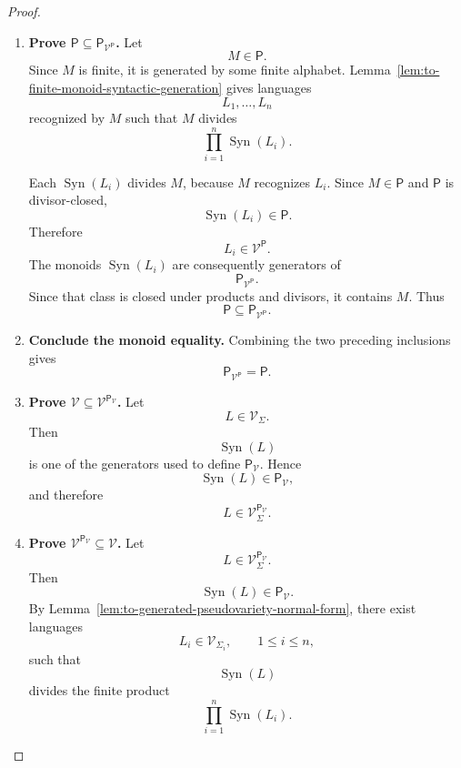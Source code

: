\begin{proof}
\begin{enumerate}
        \item \textbf{Prove
        \(\mathsf P\subseteq\mathsf P_{\mathcal V^{\mathsf P}}\).}
        Let
        \[
            M\in\mathsf P.
        \]
        Since \(M\) is finite, it is generated by some finite alphabet.
        Lemma~\ref{lem:to-finite-monoid-syntactic-generation} gives languages
        \[
            L_1,\dots,L_n
        \]
        recognized by \(M\) such that \(M\) divides
        \[
            \prod_{i=1}^n\operatorname{Syn}(L_i).
        \]

        Each \(\operatorname{Syn}(L_i)\) divides \(M\), because \(M\)
        recognizes \(L_i\). Since \(M\in\mathsf P\) and \(\mathsf P\) is
        divisor-closed,
        \[
            \operatorname{Syn}(L_i)\in\mathsf P.
        \]
        Therefore
        \[
            L_i\in\mathcal V^{\mathsf P}.
        \]
        The monoids \(\operatorname{Syn}(L_i)\) are consequently generators
        of
        \[
            \mathsf P_{\mathcal V^{\mathsf P}}.
        \]
        Since that class is closed under products and divisors, it contains
        \(M\). Thus
        \[
            \mathsf P
            \subseteq
            \mathsf P_{\mathcal V^{\mathsf P}}.
        \]

        \item \textbf{Conclude the monoid equality.}
        Combining the two preceding inclusions gives
        \[
            \mathsf P_{\mathcal V^{\mathsf P}}
            =
            \mathsf P.
        \]

        \item \textbf{Prove
        \(\mathcal V\subseteq
        \mathcal V^{\mathsf P_{\mathcal V}}\).}
        Let
        \[
            L\in\mathcal V_\Sigma.
        \]
        Then
        \[
            \operatorname{Syn}(L)
        \]
        is one of the generators used to define
        \(\mathsf P_{\mathcal V}\). Hence
        \[
            \operatorname{Syn}(L)\in\mathsf P_{\mathcal V},
        \]
        and therefore
        \[
            L\in
            \mathcal V^{\mathsf P_{\mathcal V}}_\Sigma.
        \]

        \item \textbf{Prove
        \(\mathcal V^{\mathsf P_{\mathcal V}}\subseteq\mathcal V\).}
        Let
        \[
            L\in
            \mathcal V^{\mathsf P_{\mathcal V}}_\Sigma.
        \]
        Then
        \[
            \operatorname{Syn}(L)
            \in
            \mathsf P_{\mathcal V}.
        \]
        By
        Lemma~\ref{lem:to-generated-pseudovariety-normal-form}, there exist
        languages
        \[
            L_i\in\mathcal V_{\Sigma_i},
            \qquad
            1\leq i\leq n,
        \]
        such that
        \[
            \operatorname{Syn}(L)
        \]
        divides the finite product
        \[
            \prod_{i=1}^n
            \operatorname{Syn}(L_i).
        \]


\end{enumerate}
\end{proof}

